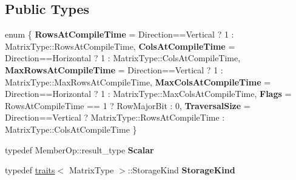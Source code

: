 \subsection*{Public Types}
\begin{DoxyCompactItemize}
\item 
\mbox{\label{struct_eigen_1_1internal_1_1traits_3_01_partial_redux_expr_3_01_matrix_type_00_01_member_op_00_01_direction_01_4_01_4_affce94157007328d7fd201da213bbe1e}} 
enum \{ \newline
{\bfseries Rows\+At\+Compile\+Time} = Direction==Vertical ? 1 \+: Matrix\+Type\+::Rows\+At\+Compile\+Time, 
{\bfseries Cols\+At\+Compile\+Time} = Direction==Horizontal ? 1 \+: Matrix\+Type\+::Cols\+At\+Compile\+Time, 
{\bfseries Max\+Rows\+At\+Compile\+Time} = Direction==Vertical ? 1 \+: Matrix\+Type\+::Max\+Rows\+At\+Compile\+Time, 
{\bfseries Max\+Cols\+At\+Compile\+Time} = Direction==Horizontal ? 1 \+: Matrix\+Type\+::Max\+Cols\+At\+Compile\+Time, 
\newline
{\bfseries Flags} = Rows\+At\+Compile\+Time == 1 ? Row\+Major\+Bit \+: 0, 
{\bfseries Traversal\+Size} = Direction==Vertical ? Matrix\+Type\+::Rows\+At\+Compile\+Time \+: Matrix\+Type\+::Cols\+At\+Compile\+Time
 \}
\item 
\mbox{\label{struct_eigen_1_1internal_1_1traits_3_01_partial_redux_expr_3_01_matrix_type_00_01_member_op_00_01_direction_01_4_01_4_a556790333f27009112a1bb9e3ba1b9e7}} 
typedef Member\+Op\+::result\+\_\+type {\bfseries Scalar}
\item 
\mbox{\label{struct_eigen_1_1internal_1_1traits_3_01_partial_redux_expr_3_01_matrix_type_00_01_member_op_00_01_direction_01_4_01_4_ac45b99c042ca4ebf9195532aed5d9875}} 
typedef \mbox{\hyperlink{struct_eigen_1_1internal_1_1traits}{traits}}$<$ Matrix\+Type $>$\+::Storage\+Kind {\bfseries Storage\+Kind}
\item 
\mbox{\label{struct_eigen_1_1internal_1_1traits_3_01_partial_redux_expr_3_01_matrix_type_00_01_member_op_00_01_direction_01_4_01_4_ab185c3fff37e5e5253fdfc037c1abc16}} 

\end{DoxyCompactItemize}

